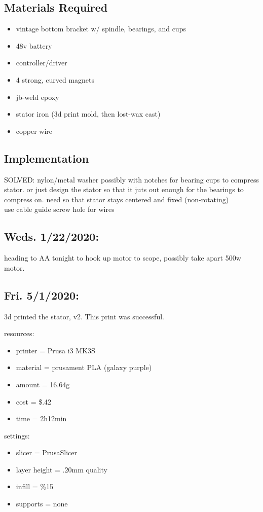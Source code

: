 \documentclass[11pt]{article} %
\begin{document}
\subsection*{Materials Required}

\begin{itemize}
\item vintage bottom bracket w/ spindle, bearings, and cups
\item 48v battery
\item controller/driver
\item 4 strong, curved magnets
\item jb-weld epoxy
\item stator iron (3d print mold, then lost-wax cast)
\item copper wire
\end{itemize}

\subsection*{Implementation}

\noindent SOLVED: nylon/metal washer possibly with notches for bearing cups to compress stator. or just design the stator so that it juts out enough for the bearings to compress on. need so that stator stays centered and fixed (non-rotating) \\

\noindent use cable guide screw hole for wires \\


\subsection*{Weds. 1/22/2020:} heading to AA tonight to hook up motor to scope, possibly take apart 500w motor.

\subsection*{Fri. 5/1/2020:} 3d printed the stator, v2. This print was successful.


resources:
\begin{itemize}
\item printer = Prusa i3 MK3S
\item material = prusament PLA (galaxy purple)
\item amount = 16.64g
\item cost = \$.42
\item time = 2h12min
\end{itemize}
settings:
\begin{itemize}
\item slicer = PrusaSlicer
\item layer height = .20mm quality
\item infill = \%15
\item supports = none
\end{itemize}
\end{document}
